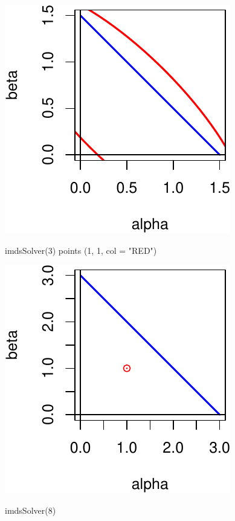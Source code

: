 \documentclass[
  12pt,
  letterpaper,
  DIV=11,
  numbers=noendperiod]{scrreprt}
\newenvironment{Shaded}{\begin{snugshade}}{\end{snugshade}}
\newcommand{\AttributeTok}[1]{\textcolor[rgb]{0.40,0.45,0.13}{#1}}
\newcommand{\DecValTok}[1]{\textcolor[rgb]{0.68,0.00,0.00}{#1}}
\newcommand{\FunctionTok}[1]{\textcolor[rgb]{0.28,0.35,0.67}{#1}}
\newcommand{\NormalTok}[1]{\textcolor[rgb]{0.00,0.23,0.31}{#1}}
\newcommand{\StringTok}[1]{\textcolor[rgb]{0.13,0.47,0.30}{#1}}
\theoremstyle{remark}
\begin{document}
\includegraphics{inverse_files/figure-pdf/unnamed-chunk-3-2.pdf}

\begin{Shaded}
\begin{Highlighting}[]
\FunctionTok{imdsSolver}\NormalTok{(}\DecValTok{3}\NormalTok{)}
\FunctionTok{points}\NormalTok{ (}\DecValTok{1}\NormalTok{, }\DecValTok{1}\NormalTok{, }\AttributeTok{col =} \StringTok{"RED"}\NormalTok{)}
\end{Highlighting}
\end{Shaded}

\includegraphics{inverse_files/figure-pdf/unnamed-chunk-3-3.pdf}

\begin{Shaded}
\begin{Highlighting}[]
\FunctionTok{imdsSolver}\NormalTok{(}\DecValTok{8}\NormalTok{)}
\end{Highlighting}
\end{Shaded}
\end{document}
